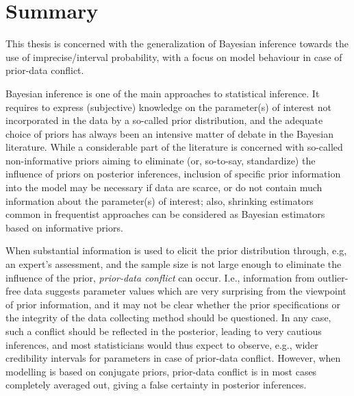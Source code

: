 
\chapter*{Summary}

This thesis is concerned with the generalization of Bayesian inference towards the use of imprecise/interval probability,
with a focus on model behaviour in case of prior-data conflict.

Bayesian inference is one of the main approaches to statistical inference.
It requires to express (subjective) knowledge on the parameter(s) of interest not incorporated in the data by a so-called prior distribution,
and the adequate choice of priors has always been an intensive matter of debate in the Bayesian literature.
While a considerable part of the literature is concerned with so-called non-informative priors
aiming to eliminate (or, so-to-say, standardize) the influence of priors on posterior inferences,
inclusion of specific prior information into the model may be necessary if data are scarce,
or do not contain much information about the parameter(s) of interest;
also, shrinking estimators common in frequentist approaches can be considered as Bayesian estimators based on informative priors.

When substantial information is used to elicit the prior distribution through, e.g, an expert's assessment,
and the sample size is not large enough to eliminate the influence of the prior, \emph{prior-data conflict} can occur.
I.e., information from outlier-free data suggests parameter values which are very surprising from the viewpoint of prior information,
and it may not be clear whether the prior specifications or the integrity of the data collecting method should be questioned.
In any case, such a conflict should be reflected in the posterior, leading to very cautious inferences,
and most statisticians would thus expect to observe, e.g., wider credibility intervals for parameters in case of prior-data conflict.
However, when modelling is based on conjugate priors, prior-data conflict is in most cases completely averaged out,
giving a false certainty in posterior inferences.

%
%
%

